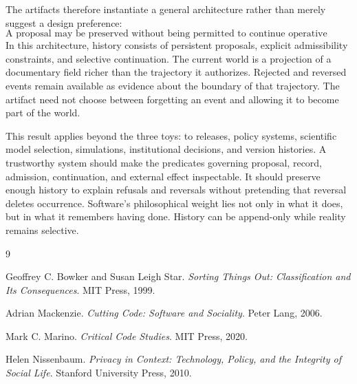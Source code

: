 \documentclass[11pt]{article}
\begin{document}
The artifacts therefore instantiate a general architecture rather than merely suggest a design preference:
\begin{equation}
  \boxed{\text{A proposal may be preserved without being permitted to continue operative state.}}
  \label{eq:main-result}
\end{equation}
In this architecture, history consists of persistent proposals, explicit admissibility constraints, and selective continuation. The current world is a projection of a documentary field richer than the trajectory it authorizes. Rejected and reversed events remain available as evidence about the boundary of that trajectory. The artifact need not choose between forgetting an event and allowing it to become part of the world.

This result applies beyond the three toys: to releases, policy systems, scientific model selection, simulations, institutional decisions, and version histories. A trustworthy system should make the predicates governing proposal, record, admission, continuation, and external effect inspectable. It should preserve enough history to explain refusals and reversals without pretending that reversal deletes occurrence. Software's philosophical weight lies not only in what it does, but in what it remembers having done. History can be append-only while reality remains selective.

\begin{thebibliography}{9}

Geoffrey C. Bowker and Susan Leigh Star.
\newblock \emph{Sorting Things Out: Classification and Its Consequences}.
\newblock MIT Press, 1999.

Adrian Mackenzie.
\newblock \emph{Cutting Code: Software and Sociality}.
\newblock Peter Lang, 2006.

Mark C. Marino.
\newblock \emph{Critical Code Studies}.
\newblock MIT Press, 2020.

Helen Nissenbaum.
\newblock \emph{Privacy in Context: Technology, Policy, and the Integrity of Social Life}.
\newblock Stanford University Press, 2010.

\end{thebibliography}
\end{document}
